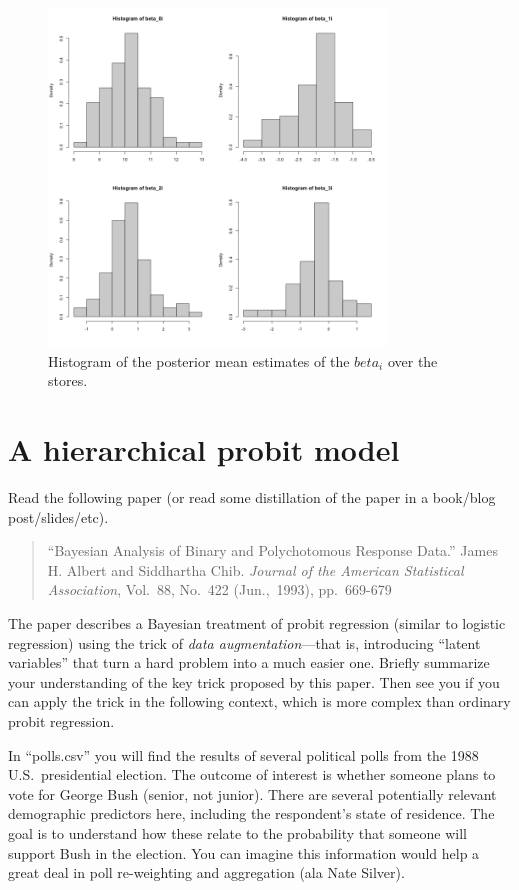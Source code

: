\documentclass[11pt]{article}
\begin{document}
\begin{figure}[h]
    \centering
    \includegraphics[width=0.8\textwidth]{Ex5/figures/hist_betai.png}
    \caption{Histogram of the posterior mean estimates of the $beta_i$ over the stores.}
    \label{fig:hist_betai}
\end{figure}


\section{A hierarchical probit model}

Read the following paper (or read some distillation of the paper in a book/blog post/slides/etc).  
\begin{quotation}
``Bayesian Analysis of Binary and Polychotomous Response Data.''  James H. Albert and Siddhartha Chib.  \textit{Journal of the American Statistical Association}, Vol.~88, No.~422 (Jun.,~1993), pp.~669-679
\end{quotation}

The paper describes a Bayesian treatment of probit regression (similar to logistic regression) using the trick of \textit{data augmentation}---that is, introducing ``latent variables'' that turn a hard problem into a much easier one.  Briefly summarize your understanding of the key trick proposed by this paper.  Then see you if you can apply the trick in the following context, which is more complex than ordinary probit regression.

In ``polls.csv'' you will find the results of several political polls from the 1988 U.S.~presidential election.  The outcome of interest is whether someone plans to vote for George Bush (senior, not junior).  There are several potentially relevant demographic predictors here, including the respondent's state of residence.  The goal is to understand how these relate to the probability that someone will support Bush in the election.  You can imagine this information would help a great deal in poll re-weighting and aggregation (ala Nate Silver).
\end{document}
